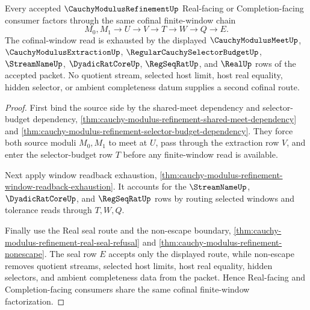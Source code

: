 \begin{theorem}
\label{thm:cauchy-modulus-refinement-cofinal-window-factorization}
Every accepted $\CauchyModulusRefinementUp$ Real-facing or Completion-facing consumer factors through the same cofinal finite-window chain
$$
M_0,M_1 \longrightarrow U \longrightarrow V \longrightarrow T \longrightarrow W \longrightarrow Q \longrightarrow E.
$$
The cofinal-window read is exhausted by the displayed $\CauchyModulusMeetUp$, $\CauchyModulusExtractionUp$, $\RegularCauchySelectorBudgetUp$, $\StreamNameUp$, $\DyadicRatCoreUp$, $\RegSeqRatUp$, and $\RealUp$ rows of the accepted packet. No quotient stream, selected host limit, host real equality, hidden selector, or ambient completeness datum supplies a second cofinal route.
\end{theorem}
\begin{proof}
First bind the source side by the shared-meet dependency and selector-budget dependency, \autoref{thm:cauchy-modulus-refinement-shared-meet-dependency} and \autoref{thm:cauchy-modulus-refinement-selector-budget-dependency}. They force both source moduli $M_0,M_1$ to meet at $U$, pass through the extraction row $V$, and enter the selector-budget row $T$ before any finite-window read is available.

Next apply window readback exhaustion, \autoref{thm:cauchy-modulus-refinement-window-readback-exhaustion}. It accounts for the $\StreamNameUp$, $\DyadicRatCoreUp$, and $\RegSeqRatUp$ rows by routing selected windows and tolerance reads through $T,W,Q$.

Finally use the Real seal route and the non-escape boundary, \autoref{thm:cauchy-modulus-refinement-real-seal-refusal} and \autoref{thm:cauchy-modulus-refinement-nonescape}. The seal row $E$ accepts only the displayed route, while non-escape removes quotient streams, selected host limits, host real equality, hidden selectors, and ambient completeness data from the packet. Hence Real-facing and Completion-facing consumers share the same cofinal finite-window factorization.
\end{proof}

